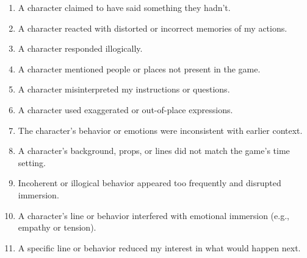 \documentclass[12pt]{article}
\begin{document}
\begin{enumerate}[resume]
  \item A character claimed to have said something they hadn’t.
  \item A character reacted with distorted or incorrect memories of my actions.
  \item A character responded illogically.
  \item A character mentioned people or places not present in the game.
  \item A character misinterpreted my instructions or questions.
  \item A character used exaggerated or out-of-place expressions.
  \item The character’s behavior or emotions were inconsistent with earlier context.
  \item A character's background, props, or lines did not match the game's time setting.
  \item Incoherent or illogical behavior appeared too frequently and disrupted immersion.
  \item A character's line or behavior interfered with emotional immersion (e.g., empathy or tension).
  \item A specific line or behavior reduced my interest in what would happen next.
\end{enumerate}
\end{document}
